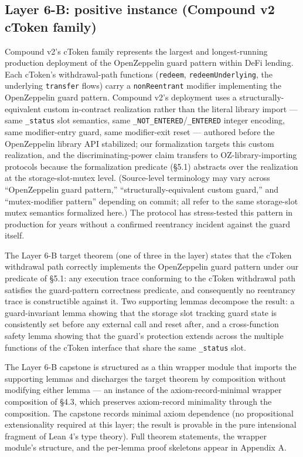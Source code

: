 \subsection{Layer 6-B: positive instance (Compound v2 cToken
family)}\label{layer-6-b-positive-instance-compound-v2-ctoken-family}

Compound v2's cToken family represents the largest and longest-running
production deployment of the OpenZeppelin guard pattern within DeFi
lending. Each cToken's withdrawal-path functions (\texttt{redeem},
\texttt{redeemUnderlying}, the underlying \texttt{transfer} flows) carry
a \texttt{nonReentrant} modifier implementing the OpenZeppelin guard
pattern. Compound v2's deployment uses a structurally-equivalent custom
in-contract realization rather than the literal library import --- same
\texttt{\_status} slot semantics, same
\texttt{\_NOT\_ENTERED}/\texttt{\_ENTERED} integer encoding, same
modifier-entry guard, same modifier-exit reset --- authored before the
OpenZeppelin library API stabilized; our formalization targets this
custom realization, and the discriminating-power claim transfers to
OZ-library-importing protocols because the formalization predicate
(§5.1) abstracts over the realization at the storage-slot-mutex level.
(Source-level terminology may vary across ``OpenZeppelin guard
pattern,'' ``structurally-equivalent custom guard,'' and
``mutex-modifier pattern'' depending on commit; all refer to the same
storage-slot mutex semantics formalized here.) The protocol has
stress-tested this pattern in production for years without a confirmed
reentrancy incident against the guard itself.

The Layer 6-B target theorem (one of three in the layer) states that the
cToken withdrawal path correctly implements the OpenZeppelin guard
pattern under our predicate of §5.1: any execution trace conforming to
the cToken withdrawal path satisfies the guard-pattern correctness
predicate, and consequently no reentrancy trace is constructible against
it. Two supporting lemmas decompose the result: a guard-invariant lemma
showing that the storage slot tracking guard state is consistently set
before any external call and reset after, and a cross-function safety
lemma showing that the guard's protection extends across the multiple
functions of the cToken interface that share the same \texttt{\_status}
slot.

The Layer 6-B capstone is structured as a thin wrapper module that
imports the supporting lemmas and discharges the target theorem by
composition without modifying either lemma --- an instance of the
axiom-record-minimal wrapper composition of §4.3, which preserves
axiom-record minimality through the composition. The capstone records
minimal axiom dependence (no propositional extensionality required at
this layer; the result is provable in the pure intensional fragment of
Lean 4's type theory). Full theorem statements, the wrapper module's
structure, and the per-lemma proof skeletons appear in Appendix A.

